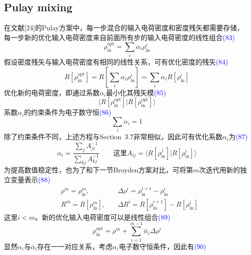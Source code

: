 \documentclass[14pt]{article}      %
\begin{document}
\subsection{Pulay mixing}
在文献[24]的\textrm{Pulay}方案中，每一步混合的输入电荷密度和密度残矢都需要存储，每一步新的优化输入电荷密度来自前面所有步的输入电荷密度的线性组合\textcolor{blue}{(83)}
\begin{displaymath}
	\rho_{\mathrm{in}}^{\mathrm{opt}}=\sum_i\alpha_i\rho_{\mathrm{in}}^i
\end{displaymath}
假设密度残矢与输入电荷密度有相同的线性关系，可有优化密度的残矢\textcolor{blue}{(84)}
\begin{displaymath}
	R[\rho_{\mathrm{in}}^{\mathrm{opt}}]=R[\sum_i\alpha_i\rho_{\mathrm{in}}^i]=\sum_i\alpha_iR[\rho_{\mathrm{in}}^i]
\end{displaymath}
优化新的电荷密度，即通过系数$\alpha_i$最小化其残矢模\textcolor{blue}{(85)}
\begin{displaymath}
	\langle R[\rho_{\mathrm{in}}^{\mathrm{opt}}]|R[\rho_{\mathrm{in}}^{\mathrm{opt}}]\rangle
\end{displaymath}
系数$\alpha_i$的约束条件为电子数守恒\textcolor{blue}{(86)}
\begin{displaymath}
	\sum_i\alpha_i=1
\end{displaymath}
除了约束条件不同，上述方程与\textrm{Section~3.7}非常相似，因此可有优化系数$\alpha_i$为\textcolor{blue}{(87)}
\begin{displaymath}
	\alpha_i=\dfrac{\sum_jA_{ji}^{-1}}{\sum_{kj}A_{kj}^{-1}}\qquad\mbox{这里} A_{ij}=\langle R[\rho_{\mathrm{in}}^j]|R[\rho_{\mathrm{in}}^i]\rangle
\end{displaymath}
为提高数值稳定性，也为了和下一节\textrm{Broyden}方案对比，可将第$m$次迭代用新的独立变量表示\textcolor{blue}{(88)}
\begin{displaymath}
	\begin{aligned}
		&\rho^m=\rho_{\mathrm{in}}^m,&\Delta\rho^i=\rho_{\mathrm{in}}^{i+1}-\rho_{\mathrm{in}}^{i}\\
		&R^m=R[\rho_{\mathrm{in}}^m],\quad&\Delta R^i=R[\rho_{\mathrm{in}}^{i+1}]-R[\rho_{\mathrm{in}}^{i}]
	\end{aligned}
\end{displaymath}
这里$i<m$。新的优化输入电荷密度可以是线性组合\textcolor{blue}{(89)}
\begin{displaymath}
	\rho_{\mathrm{in}}^{\mathrm{opt}}=\rho^m+\sum_{i=1}^{m-1}\bar{\alpha}_i\Delta\rho^i
\end{displaymath}
显然$\alpha_i$与$\bar{\alpha}_i$存在一一对应关系，考虑$\alpha_i$电子数守恒条件，因此有\textcolor{blue}{(90)}
\end{document}
